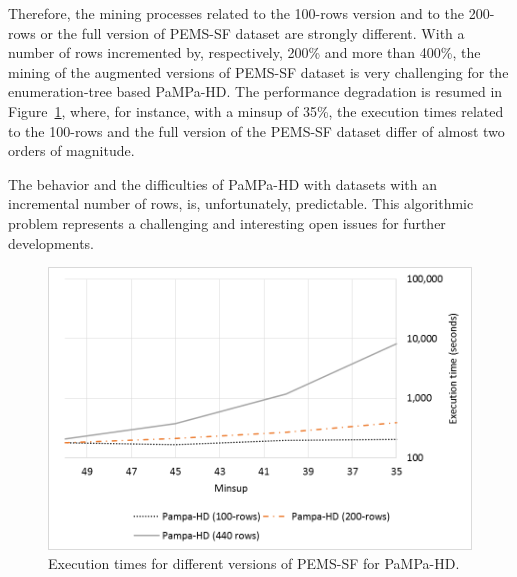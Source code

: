 Therefore, the mining processes related to the 100-rows version and to the 200-rows or the full version of PEMS-SF dataset are strongly different. With a number of rows incremented by, respectively, 200\% and more than 400\%, the mining of the augmented versions of PEMS-SF dataset is very challenging for the enumeration-tree based PaMPa-HD.
The performance degradation is resumed in Figure~\ref{pampa_pems_confronto}, where, for instance, with a minsup of 35\%, the execution times related to the 100-rows and the full version of the PEMS-SF dataset differ of almost two orders of magnitude.

The behavior and the difficulties of PaMPa-HD with datasets with an incremental number of rows, is, unfortunately, predictable. This algorithmic problem represents a challenging and interesting open issues for further developments.
\begin{figure}[!t]
\includegraphics[width=5in]{chapters/pampa/immagini_extension/pampa_pems_confronto.png}
\caption{Execution times for different versions of PEMS-SF for PaMPa-HD.}
\label{pampa_pems_confronto}
\end{figure}





